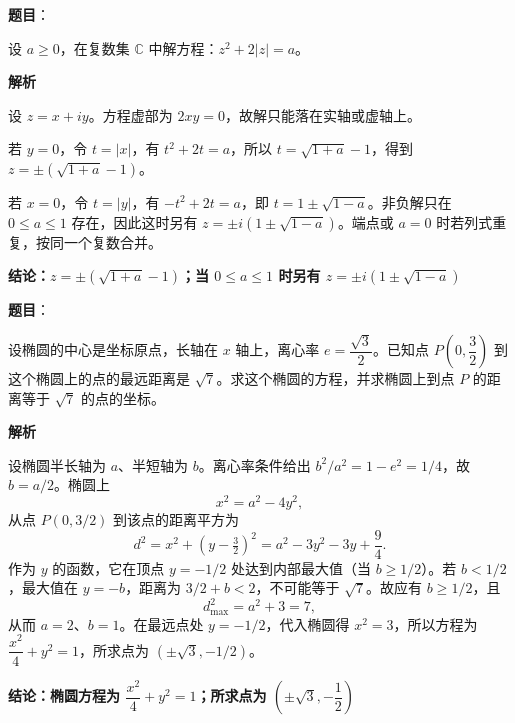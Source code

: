 \begin{answer}

\textbf{题目}：

设 $a\ge0$，在复数集 $\mathbb C$ 中解方程：$z^2+2|z|=a$。

\textbf{解析}

设 $z=x+iy$。方程虚部为 $2xy=0$，故解只能落在实轴或虚轴上。

若 $y=0$，令 $t=|x|$，有 $t^2+2t=a$，所以 $t=\sqrt{1+a}-1$，得到 $z=\pm(\sqrt{1+a}-1)$。

若 $x=0$，令 $t=|y|$，有 $-t^2+2t=a$，即 $t=1\pm\sqrt{1-a}$。非负解只在 $0\le a\le1$ 存在，因此这时另有 $z=\pm i(1\pm\sqrt{1-a})$。端点或 $a=0$ 时若列式重复，按同一个复数合并。

\textbf{结论：$z=\pm(\sqrt{1+a}-1)$；当 $0\le a\le1$ 时另有 $z=\pm i(1\pm\sqrt{1-a})$}


\end{answer}
\begin{answer}

\textbf{题目}：

设椭圆的中心是坐标原点，长轴在 $x$ 轴上，离心率 $e=\dfrac{\sqrt3}{2}$。已知点 $P\left(0,\dfrac32\right)$ 到这个椭圆上的点的最远距离是 $\sqrt7$。求这个椭圆的方程，并求椭圆上到点 $P$ 的距离等于 $\sqrt7$ 的点的坐标。

\textbf{解析}

设椭圆半长轴为 $a$、半短轴为 $b$。离心率条件给出 $b^2/a^2=1-e^2=1/4$，故 $b=a/2$。椭圆上
\nopagebreak[4]
\[
x^2=a^2-4y^2,
\]
从点 $P(0,3/2)$ 到该点的距离平方为
\nopagebreak[4]
\[
d^2=x^2+(y-\tfrac32)^2
=a^2-3y^2-3y+\frac94.
\]
作为 $y$ 的函数，它在顶点 $y=-1/2$ 处达到内部最大值（当 $b\ge1/2$）。若 $b<1/2$，最大值在 $y=-b$，距离为 $3/2+b<2$，不可能等于 $\sqrt7$。故应有 $b\ge1/2$，且
\nopagebreak[4]
\[
d_{\max}^2=a^2+3=7,
\]
从而 $a=2$、$b=1$。在最远点处 $y=-1/2$，代入椭圆得 $x^2=3$，所以方程为 $\dfrac{x^2}{4}+y^2=1$，所求点为 $(\pm\sqrt3,-1/2)$。

\textbf{结论：椭圆方程为 $\dfrac{x^2}{4}+y^2=1$；所求点为 $(\pm\sqrt3,-\dfrac12)$}


\end{answer}
